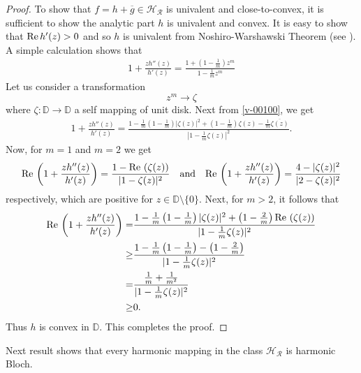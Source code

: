 \documentclass[a4paper,12pt]{amsart}
\theoremstyle{definition}
\begin{document}
	\begin{proof}
		To show that $f=h+\overline{g}\in\mathcal{H_R}$ is univalent and close-to-convex, it is sufficient to show the analytic part $h$ is univalent and convex.
		It is easy to show that ${\rm Re\,}h'(z)>0$ and so $h$ is univalent from Noshiro-Warshawski Theorem (see \cite{Duren-1983}). A simple calculation shows that 
		\begin{align}\label{v-00100}
			1+\frac{zh''(z)}{h'(z)}=\frac{1+\left(1-\frac{1}{m}\right)z^m}{1-\frac{1}{m}z^m}	
		\end{align}
		Let us consider a transformation $$z^m\rightarrow\zeta$$
		where $\zeta:\mathbb{D}\rightarrow\mathbb{D}$ a self mapping of unit disk. Next from \eqref{v-00100}, we get
		\begin{align*}
			1+\frac{zh''(z)}{h'(z)}=\frac{1-\frac{1}{m}\left(1-\frac{1}{m}\right)|\zeta(z)|^2+\left(1-\frac{1}{m}\right)\zeta(z)-\frac{1}{m}\overline{\zeta(z)}}{|1-\frac{1}{m}\zeta(z)|^2}.
		\end{align*}
		Now, for $m=1$ and $m=2$ we get 
		$${\rm Re\,}\left(1+\frac{zh''(z)}{h'(z)}\right)=\frac{1-{\rm Re\,}\left(\zeta(z)\right)}{|1-\zeta(z)|^2}\quad\text{and}\quad {\rm Re\,}\left(1+\frac{zh''(z)}{h'(z)}\right)=\frac{4-|\zeta(z)|^2}{|2-\zeta(z)|^2}$$
		respectively, which are positive for $z\in\mathbb{D}\setminus\{0\}.$ Next, for $m>2$, it follows that
		\begin{align*}
			{\rm Re\,}\left(1+\frac{zh''(z)}{h'(z)}\right)=&\frac{1-\frac{1}{m}\left(1-\frac{1}{m}\right)|\zeta(z)|^2+\left(1-\frac{2}{m}\right){\rm Re\,}\left(\zeta(z)\right)}{|1-\frac{1}{m}\zeta(z)|^2}\\
			\ge & \frac{1-\frac{1}{m}\left(1-\frac{1}{m}\right)-\left(1-\frac{2}{m}\right)}{|1-\frac{1}{m}\zeta(z)|^2}\\
			= & \frac{\frac{1}{m}+\frac{1}{m^2}}{|1-\frac{1}{m}\zeta(z)|^2}\\
			\ge & 0.
		\end{align*}
		Thus $h$ is convex in $\mathbb{D}.$ This completes the proof.
	\end{proof}
	
Next result shows that every harmonic mapping in the class $\mathcal{H_R}$ is harmonic Bloch.
	
\end{document}

